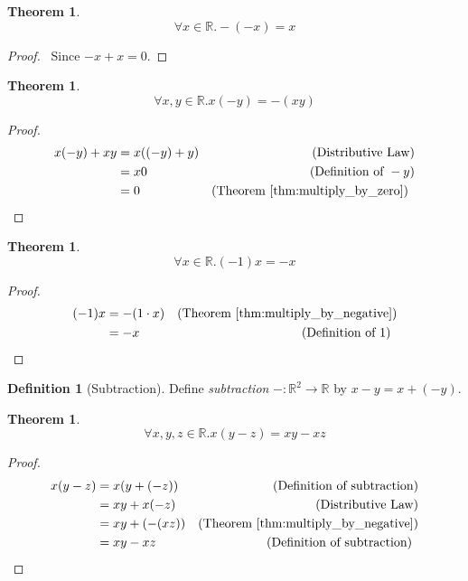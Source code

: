 \documentclass{report}
\let\qed\relax
\newtheorem{thm}[ax]{Theorem}
\theoremstyle{definition}
\newtheorem{df}[ax]{Definition}
\begin{document}
\begin{thm}
\label{thm:minus_minus}
\[ \forall x \in \mathbb{R}. -(-x) = x \]
\end{thm}

\begin{proof}
\pf\ Since $-x + x = 0$. \qed
\end{proof}

\begin{thm}
\label{thm:multiply_by_negative}
\[ \forall x,y \in \mathbb{R}. x(-y) = -(xy) \]
\end{thm}

\begin{proof}
\pf
\begin{align*}
x(-y) + xy & = x((-y)+y) & (\text{Distributive Law}) \\
& = x0 & (\text{Definition of } -y) \\
& = 0 & (\text{Theorem \ref{thm:multiply_by_zero}}) \enspace \qed
\end{align*}
\end{proof}

\begin{thm}
\label{thm:multiply_by_minus_one}
\[ \forall x \in \mathbb{R}. (-1)x = -x \]
\end{thm}

\begin{proof}
\pf
\begin{align*}
	(-1)x & = -(1\cdot x) & (\text{Theorem \ref{thm:multiply_by_negative}}) \\
	& = -x & (\text{Definition of } 1) \enspace \qed
\end{align*}
\end{proof}

\begin{df}[Subtraction]
Define \emph{subtraction} $- : \mathbb{R}^2 \rightarrow \mathbb{R}$ by $x - y = x + (-y)$.
\end{df}

\begin{thm}
\[ \forall x,y,z \in \mathbb{R}. x(y-z) = xy-xz \]
\end{thm}

\begin{proof}
\pf
\begin{align*}
x (y-z) & = x(y + (-z)) & (\text{Definition of subtraction}) \\
& = xy + x(-z) & (\text{Distributive Law}) \\
& = xy + (-(xz)) & (\text{Theorem \ref{thm:multiply_by_negative}}) \\
& = xy - xz & (\text{Definition of subtraction}) \enspace \qed
\end{align*}
\end{proof}
\end{document}
